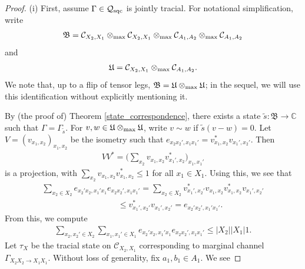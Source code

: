 \documentclass[11pt]{amsart}
\newcommand{\cl}[1]{\mathcal{#1}}
\newcommand{\bb}[1]{\mathbb{#1}}
\begin{document}
\begin{proof}
(i) First, assume $\Gamma \in \cl{Q}_{\rm sqc}$ is jointly tracial. For notational simplification, write
\begin{gather*}
	\mathfrak{B} = \cl{C}_{X_{2}, X_{1}}\otimes_{\rm max} \cl{C}_{X_{2}, X_{1}}\otimes_{\rm max} \cl{C}_{A_{1}, A_{2}}\otimes_{\rm max} \cl{C}_{A_{1}, A_{2}}
\end{gather*}
\noindent and
\begin{gather*}
	\mathfrak{U} = \cl{C}_{X_{2}, X_{1}}\otimes_{\rm max} \cl{C}_{A_{1}, A_{2}}.
\end{gather*}
\noindent We note that, up to a flip of tensor legs, $\mathfrak{B} = \mathfrak{U}\otimes_{\rm max} \mathfrak{U}$; in the sequel, we will use this identification without explicitly mentioning it. 

By (the proof of) Theorem \ref{state_correspondence}, there exists a state $\tilde{s}: \mathfrak{B}\rightarrow \bb{C}$ such that $\Gamma = \Gamma_{\tilde{s}}$. For $v, w \in \mathfrak{U}\otimes_{\rm max} \mathfrak{U}$, write $v \sim w$ if $\tilde{s}(v-w) = 0$. Let $V = (v_{x_{1}, x_{2}})_{x_{1}, x_{2}}$ be the isometry such that $e_{x_{2}x_{2}', x_{1}x_{1}'} = v_{x_{1}, x_{2}}^{*}v_{x_{1}', x_{2}'}$. Then
\begin{gather*}
	VV^{*} = \bigg(\sum\limits_{x_{2}}v_{x_{1}, x_{2}}v_{x_{1}', x_{2}}^{*}\bigg)_{x_{1}, x_{1}'}
\end{gather*}
\noindent is a projection, with $\sum\limits_{x_{2}}v_{x_{1}, x_{2}}v_{x_{1}, x_{2}}^{*} \leq 1$ for all $x_{1} \in X_{1}$. Using this, we see that
\begin{gather*}
	\sum\limits_{x_{2} \in X_{2}}e_{x_{2}'x_{2}, x_{1}'x_{1}}e_{x_{2}x_{2}', x_{1}x_{1}'} = \sum\limits_{x_{2} \in X_{2}}v_{x_{1}', x_{2}'}^{*}v_{x_{1}, x_{2}}v_{x_{1}, x_{2}}^{*}v_{x_{1}', x_{2}'} \\
\;\;\;\;\;\;\;\;\;\;\;\;\;\;\;\;\;\;\;\;\;\;\;\;\;\;\;\;\;\;\;\;\; \leq v_{x_{1}', x_{2}'}^{*}v_{x_{1}', x_{2}'} = e_{x_{2}'x_{2}', x_{1}'x_{1}'}. 
\end{gather*}
\noindent From this, we compute
\begin{gather}\label{inequality_of_generators_one}
	\sum\limits_{x_{2}, x_{2}' \in X_{2}}\sum\limits_{x_{1}, x_{1}' \in X_{1}}e_{x_{2}'x_{2}, x_{1}'x_{1}}e_{x_{2}x_{2}', x_{1}x_{1}'} \leq |X_{2}||X_{1}|1.
\end{gather} 
\noindent Let $\tau_{X}$ be the tracial state on $\cl{C}_{X_{2}, X_{1}}$ corresponding to marginal channel $\Gamma_{X_{2}X_{2}\rightarrow X_{1}X_{1}}$. Without loss of generality, fix $a_{1}, b_{1} \in A_{1}$. We see

\end{proof}
\end{document}
